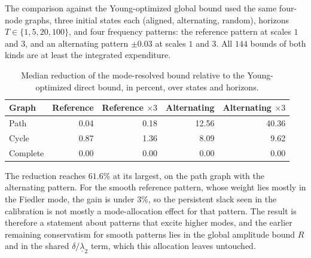 \documentclass[11pt,notitlepage]{report}
\theoremstyle{definition}
\theoremstyle{remark}
\begin{document}
The comparison against the Young-optimized global bound used the same four-node graphs, three initial states each (aligned, alternating, random), horizons $T\in\{1,5,20,100\}$, and four frequency patterns: the reference pattern at scales $1$ and $3$, and an alternating pattern $\pm0.03$ at scales $1$ and $3$. All $144$ bounds of both kinds are at least the integrated expenditure.
\begin{table}[ht]\centering\small
\caption{Median reduction of the mode-resolved bound relative to the Young-optimized direct bound, in percent, over states and horizons.}
\begin{tabular}{lrrrr}\toprule
Graph&Reference&Reference $\times3$&Alternating&Alternating $\times3$\\\midrule
Path&0.04&0.18&12.56&40.36\\
Cycle&0.87&1.36&8.09&9.62\\
Complete&0.00&0.00&0.00&0.00\\\bottomrule
\end{tabular}
\end{table}
The reduction reaches $61.6\%$ at its largest, on the path graph with the alternating pattern. For the smooth reference pattern, whose weight lies mostly in the Fiedler mode, the gain is under $3\%$, so the persistent slack seen in the calibration is not mostly a mode-allocation effect for that pattern. The result is therefore a statement about patterns that excite higher modes, and the earlier remaining conservatism for smooth patterns lies in the global amplitude bound $R$ and in the shared $\delta/\underline\lambda_2$ term, which this allocation leaves untouched.
\end{document}
